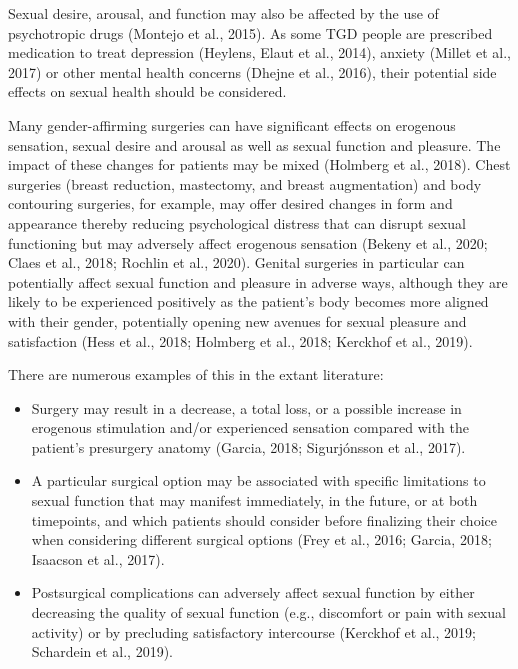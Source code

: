 \documentclass[
]{book}
\providecommand{\tightlist}{%
  \setlength{\itemsep}{0pt}\setlength{\parskip}{0pt}}
\begin{document}
Sexual desire, arousal, and function may also
be affected by the use of psychotropic drugs
(Montejo et al., 2015). As some TGD people are
prescribed medication to treat depression
(Heylens, Elaut et al., 2014), anxiety (Millet et al.,
2017) or other mental health concerns (Dhejne
et al., 2016), their potential side effects on sexual
health should be considered.

Many gender-affirming surgeries can have significant effects on erogenous sensation, sexual
desire and arousal as well as sexual function and
pleasure. The impact of these changes for patients
may be mixed (Holmberg et al., 2018). Chest
surgeries (breast reduction, mastectomy, and
breast augmentation) and body contouring surgeries, for example, may offer desired changes in
form and appearance thereby reducing psychological distress that can disrupt sexual functioning but may adversely affect erogenous sensation
(Bekeny et al., 2020; Claes et al., 2018; Rochlin
et al., 2020). Genital surgeries in particular can
potentially affect sexual function and pleasure in
adverse ways, although they are likely to be experienced positively as the patient's body becomes
more aligned with their gender, potentially opening new avenues for sexual pleasure and satisfaction (Hess et al., 2018; Holmberg et al., 2018;
Kerckhof et al., 2019).

There are numerous examples of this in the extant literature:

\begin{itemize}
\tightlist
\item
  Surgery may result in a decrease, a total loss, or a possible increase in erogenous stimulation and/or experienced sensation compared with the patient's presurgery anatomy (Garcia, 2018; Sigurjónsson et al., 2017).
\item
  A particular surgical option may be associated with specific limitations to sexual function that may manifest immediately, in the future, or at both timepoints, and which patients should consider before finalizing their choice when considering different surgical options (Frey et al., 2016; Garcia, 2018; Isaacson et al., 2017).
\item
  Postsurgical complications can adversely affect sexual function by either decreasing the quality of sexual function (e.g., discomfort or pain with sexual activity) or by precluding satisfactory intercourse (Kerckhof et al., 2019; Schardein et al., 2019).
\end{itemize}
\end{document}
